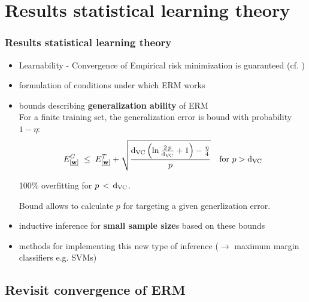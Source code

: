 \section{Results statistical learning theory}

\begin{frame}\frametitle{Results statistical learning theory}
		\begin{itemize}
			\item Learnability - Convergence of Empirical risk minimization is guaranteed (cf. )
			\item formulation of conditions under which ERM works
			\item bounds describing \textbf{generalization ability} of ERM \\
            
            For a finite training set, the generalization error is bound with probability $1-\eta$:
            \begin{equation}
				E^{G}_{[\underline{\mathbf{w}}]} \;\le\; E^{T}_{[\underline{\mathbf{w}}]} + \sqrt{\frac{\mathrm{d}_{\mathrm{VC}} \left(\ln \frac{2\,p}{\mathrm{d}_{\mathrm{VC}}} + 1\right)-\frac{\eta}{4}}{p}} \quad \text{for } p > \mathrm{d}_{\mathrm{VC}}
				\label{eq:generalizationresults}
            \end{equation}
            
            
            100\% overfitting for $p\,<\,\mathrm{d}_{\mathrm{VC}}$.{}
            
            Bound allows to calculate $p$ for targeting a given generlization error.
            
			\item inductive inference for \textbf{small sample size}s 
				based on these bounds
			\item methods for implementing this new type 
				of inference ($\rightarrow$ maximum margin classifiers e.g. {SVMs})
		\end{itemize}
\end{frame}

\subsection{Revisit convergence of ERM}

